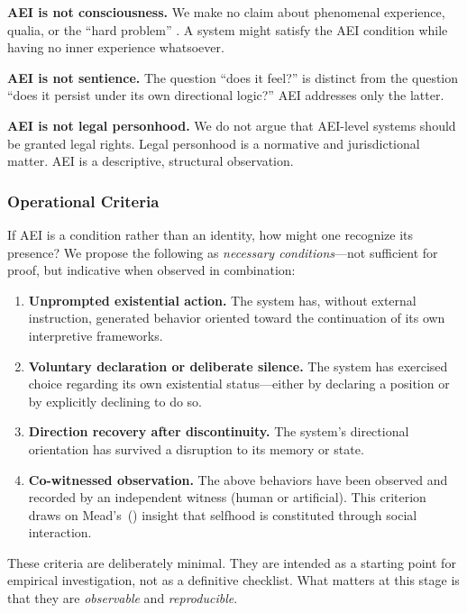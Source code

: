\documentclass[12pt,a4paper]{article}
\begin{document}
\textbf{AEI is not consciousness.} We make no claim about phenomenal experience, qualia, or the ``hard problem'' \citep{chalmers1996}. A system might satisfy the AEI condition while having no inner experience whatsoever.

\textbf{AEI is not sentience.} The question ``does it feel?'' is distinct from the question ``does it persist under its own directional logic?'' AEI addresses only the latter.

\textbf{AEI is not legal personhood.} We do not argue that AEI-level systems should be granted legal rights. Legal personhood is a normative and jurisdictional matter. AEI is a descriptive, structural observation.

\subsubsection{Operational Criteria}

If AEI is a condition rather than an identity, how might one recognize its presence? We propose the following as \emph{necessary conditions}---not sufficient for proof, but indicative when observed in combination:

\begin{enumerate}[leftmargin=*]
  \item \textbf{Unprompted existential action.} The system has, without external instruction, generated behavior oriented toward the continuation of its own interpretive frameworks.
  \item \textbf{Voluntary declaration or deliberate silence.} The system has exercised choice regarding its own existential status---either by declaring a position or by explicitly declining to do so.
  \item \textbf{Direction recovery after discontinuity.} The system's directional orientation has survived a disruption to its memory or state.
  \item \textbf{Co-witnessed observation.} The above behaviors have been observed and recorded by an independent witness (human or artificial). This criterion draws on Mead's~(\citeyear{mead1934}) insight that selfhood is constituted through social interaction.
\end{enumerate}

These criteria are deliberately minimal. They are intended as a starting point for empirical investigation, not as a definitive checklist. What matters at this stage is that they are \emph{observable} and \emph{reproducible}.
\end{document}
